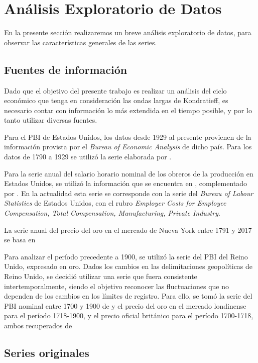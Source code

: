 \documentclass[a4paper]{article}
\begin{document}
\section{Análisis Exploratorio de Datos}
En la presente sección realizaremos un breve análisis exploratorio de datos, para observar las características generales de las series.

\subsection{Fuentes de información}

Dado que el objetivo del presente trabajo es realizar un análisis del ciclo económico que tenga en consideración las ondas largas de Kondratieff, es necesario contar con información lo más extendida en el tiempo posible, y por lo tanto utilizar diversas fuentes. 

Para el PBI de Estados Unidos, los datos desde 1929 al presente provienen de la información provista por el \textit{Bureau of Economic Analysis} de dicho país. Para los datos de 1790 a 1929 se utilizó la serie elaborada por \cite{johnston2018us}.

Para la serie anual del salario horario nominal de los obreros de la producción en Estados Unidos, se utilizó la información que se encuentra en \cite{officer2009two}, complementado por \cite{Roesch2018}. En la actualidad esta serie se corresponde con la serie del \textit{Bureau of Labour Statistics} de Estados Unidos, con el rubro \textit{Employer Costs for Employee Compensation, Total Compensation, Manufacturing, Private Industry}.

La serie anual del precio del oro en el mercado de Nueva York entre 1791 y 2017 se basa en \cite{officer2018gold}

Para analizar el período precedente a 1900, se utilizó la serie del PBI del Reino Unido, expresado en oro. Dados los cambios en las delimitaciones geopolíticas de Reino Unido, se decidió utilizar una serie que fuera consistente intertemporalmente, siendo el objetivo reconocer las fluctuaciones que no dependen de los cambios en los límites de registro. Para ello, se tomó la serie del PBI nominal entre 1700 y 1900 de \cite{Williamson2018uk} y el precio del oro en el mercado londinense para el período 1718-1900, y el precio oficial británico para el período 1700-1718, ambos recuperados de \cite{officer2018gold} 


\subsection{Series originales}
\end{document}
